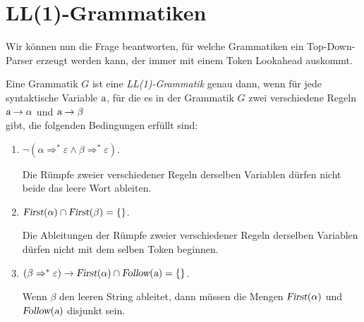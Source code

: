 \section{LL(1)-Grammatiken}
Wir k\"onnen nun die Frage beantworten, f\"ur welche Grammatiken ein Top-Down-Parser erzeugt
werden kann, der immer mit einem Token Lookahead auskommt.  

\begin{Definition}[LL(1)-Grammatik]
Eine Grammatik $G$ ist eine \emph{LL(1)-Grammatik} genau dann, wenn f\"ur jede syntaktische Variable
$\textsl{a}$, f\"ur die es in der Grammatik $G$ zwei verschiedene Regeln
\\[0.2cm]
\hspace*{1.3cm}
$\textsl{a} \rightarrow \alpha$ \quad und \quad $\textsl{a} \rightarrow \beta$ 
\\[0.2cm]
gibt, die folgenden Bedingungen erf\"ullt sind:
\begin{enumerate}
\item $\neg( \alpha \Rightarrow^* \varepsilon \wedge \beta \Rightarrow^* \varepsilon)$.

      Die R\"umpfe zweier verschiedener Regeln derselben Variablen
      d\"urfen nicht beide das leere Wort ableiten.
\item $\textsl{First}(\alpha) \cap \textsl{First}(\beta) = \{\}$.

      Die Ableitungen der R\"umpfe zweier verschiedener Regeln derselben Variablen
      d\"urfen nicht mit dem selben Token beginnen.
\item   $(\beta  \Rightarrow^* \varepsilon) \rightarrow \textsl{First}(\alpha) \cap
\textsl{Follow}(\textsl{a}) = \{\}$.

      Wenn $\beta$ den leeren String ableitet, dann m\"ussen die Mengen
      $\textsl{First}(\alpha)$ und $\textsl{Follow}(\textsl{a})$ disjunkt sein.  
      \eox
\end{enumerate}
\end{Definition}

